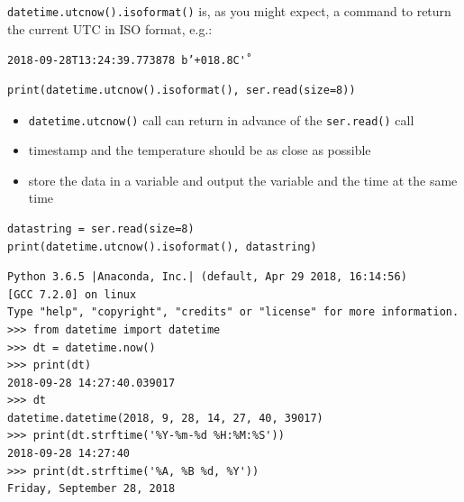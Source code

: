 \documentclass[aspectratio=1610,9pt]{beamer} %
\begin{document}
\begin{frame}[fragile]

\texttt{datetime.utcnow().isoformat()} is, as you might expect, a
command to return the current UTC in ISO format, e.g.:

\texttt{2018-09-28T13:24:39.773878 b'+018.8C\r'}

\begin{verbatim}
print(datetime.utcnow().isoformat(), ser.read(size=8))
\end{verbatim}

\begin{itemize}
\itemsep1pt\parskip0pt
\item
  \texttt{datetime.utcnow()} call can return in advance of the
  \texttt{ser.read()} call
\item
  timestamp and the temperature should be as close as possible
\item
  store the data in a variable and output the variable and the time at
  the same time
\end{itemize}

\begin{verbatim}
datastring = ser.read(size=8)
print(datetime.utcnow().isoformat(), datastring)
\end{verbatim}

\end{frame}
\begin{frame}[fragile]
\begin{verbatim}
Python 3.6.5 |Anaconda, Inc.| (default, Apr 29 2018, 16:14:56)
[GCC 7.2.0] on linux
Type "help", "copyright", "credits" or "license" for more information.
>>> from datetime import datetime
>>> dt = datetime.now()
>>> print(dt)
2018-09-28 14:27:40.039017
>>> dt
datetime.datetime(2018, 9, 28, 14, 27, 40, 39017)
>>> print(dt.strftime('%Y-%m-%d %H:%M:%S'))
2018-09-28 14:27:40
>>> print(dt.strftime('%A, %B %d, %Y'))
Friday, September 28, 2018
\end{verbatim}

\end{frame}
\end{document}
